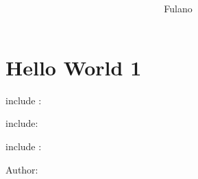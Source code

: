 \documentclass[A4paper, 12pt]{article}
\title{  }
\author{Fulano}
\begin{document}
\maketitle
\tableofcontents


\section{Hello World 1} %




include : 

include: 

include : 

Author: 

%
%
\end{document}

